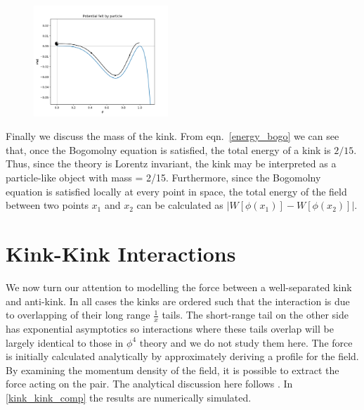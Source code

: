 \documentclass[11pt, oneside]{article}  	%
\numberwithin{equation}{section}
\begin{document}
 \begin{figure}
 \vspace{-10pt}
\centering
 \includegraphics[width=0.45\textwidth]{mech_kink.png}
  \label{mech}
 \vspace{-23pt}
\end{figure} 
 Finally we discuss the mass of the kink. From eqn.~\ref{energy_bogo} we can see that, once the Bogomolny equation is satisfied, the total energy of a kink is $2/15$. Thus, since the theory is Lorentz invariant, the kink may be interpreted as a particle-like object with mass = 2/15. Furthermore, since the Bogomolny equation is satisfied locally at every point in space, the total energy of the field between two points $x_1$ and $x_2$ can be calculated as $\left | W\left [ \phi(x_1)\right ] - W\left [ \phi(x_2)\right ]\right |$.
 
 \section{Kink-Kink Interactions}
 We now turn our attention to modelling the force between a well-separated kink and anti-kink. In all cases the kinks are ordered such that the interaction is due to overlapping of their long range $\frac{1}{x}$ tails. The short-range tail on the other side has exponential asymptotics so interactions where these tails overlap will be largely identical to those in $\phi^4$ theory and we do not study them here. The force is initially calculated analytically by approximately deriving a profile for the field. By examining the momentum density of the field, it is possible to extract the force acting on the pair. The analytical discussion here follows \cite{manton-paper}. In \textsection \ref{kink_kink_comp} the results are numerically simulated.\par
\end{document}
